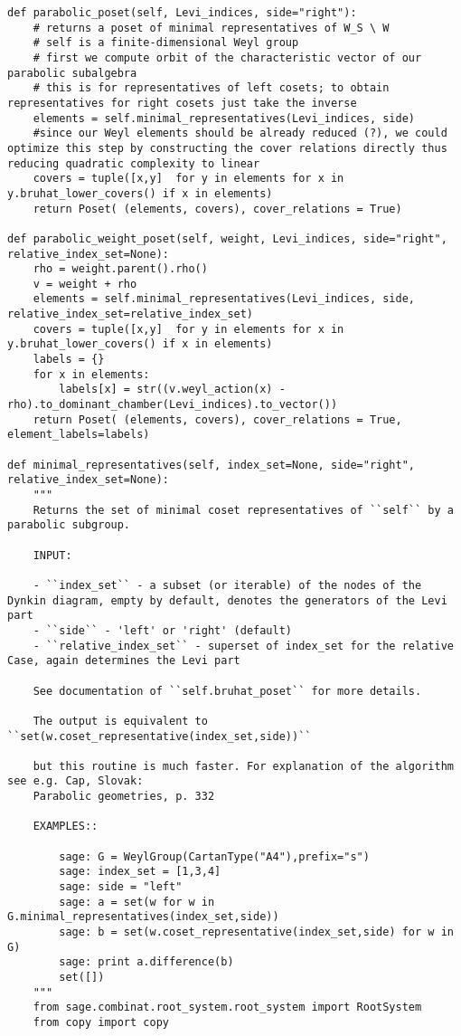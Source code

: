 \begin{verbatim}
def parabolic_poset(self, Levi_indices, side="right"):
    # returns a poset of minimal representatives of W_S \ W
    # self is a finite-dimensional Weyl group
    # first we compute orbit of the characteristic vector of our parabolic subalgebra
    # this is for representatives of left cosets; to obtain representatives for right cosets just take the inverse
    elements = self.minimal_representatives(Levi_indices, side)
    #since our Weyl elements should be already reduced (?), we could optimize this step by constructing the cover relations directly thus reducing quadratic complexity to linear
    covers = tuple([x,y]  for y in elements for x in y.bruhat_lower_covers() if x in elements)
    return Poset( (elements, covers), cover_relations = True)

def parabolic_weight_poset(self, weight, Levi_indices, side="right", relative_index_set=None):
    rho = weight.parent().rho()
    v = weight + rho
    elements = self.minimal_representatives(Levi_indices, side, relative_index_set=relative_index_set)
    covers = tuple([x,y]  for y in elements for x in y.bruhat_lower_covers() if x in elements)
    labels = {}
    for x in elements:
        labels[x] = str((v.weyl_action(x) - rho).to_dominant_chamber(Levi_indices).to_vector())
    return Poset( (elements, covers), cover_relations = True, element_labels=labels)

def minimal_representatives(self, index_set=None, side="right", relative_index_set=None):
    """
    Returns the set of minimal coset representatives of ``self`` by a parabolic subgroup.

    INPUT:

    - ``index_set`` - a subset (or iterable) of the nodes of the Dynkin diagram, empty by default, denotes the generators of the Levi part
    - ``side`` - 'left' or 'right' (default)
    - ``relative_index_set`` - superset of index_set for the relative Case, again determines the Levi part

    See documentation of ``self.bruhat_poset`` for more details.

    The output is equivalent to ``set(w.coset_representative(index_set,side))``

    but this routine is much faster. For explanation of the algorithm see e.g. Cap, Slovak:
    Parabolic geometries, p. 332

    EXAMPLES::

        sage: G = WeylGroup(CartanType("A4"),prefix="s")
        sage: index_set = [1,3,4]
        sage: side = "left"
        sage: a = set(w for w in G.minimal_representatives(index_set,side))
        sage: b = set(w.coset_representative(index_set,side) for w in G)
        sage: print a.difference(b)
        set([])
    """
    from sage.combinat.root_system.root_system import RootSystem
    from copy import copy


\end{verbatim}
